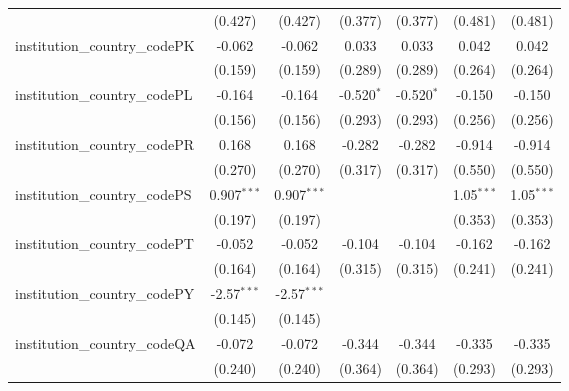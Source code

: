 \begin{tabular}{lcccccc}
                                         & (0.427)        & (0.427)        & (0.377)        & (0.377)        & (0.481)        & (0.481)\\   
   institution\_country\_codePK          & -0.062         & -0.062         & 0.033          & 0.033          & 0.042          & 0.042\\   
                                         & (0.159)        & (0.159)        & (0.289)        & (0.289)        & (0.264)        & (0.264)\\   
   institution\_country\_codePL          & -0.164         & -0.164         & -0.520$^{*}$   & -0.520$^{*}$   & -0.150         & -0.150\\   
                                         & (0.156)        & (0.156)        & (0.293)        & (0.293)        & (0.256)        & (0.256)\\   
   institution\_country\_codePR          & 0.168          & 0.168          & -0.282         & -0.282         & -0.914         & -0.914\\   
                                         & (0.270)        & (0.270)        & (0.317)        & (0.317)        & (0.550)        & (0.550)\\   
   institution\_country\_codePS          & 0.907$^{***}$  & 0.907$^{***}$  &                &                & 1.05$^{***}$   & 1.05$^{***}$\\   
                                         & (0.197)        & (0.197)        &                &                & (0.353)        & (0.353)\\   
   institution\_country\_codePT          & -0.052         & -0.052         & -0.104         & -0.104         & -0.162         & -0.162\\   
                                         & (0.164)        & (0.164)        & (0.315)        & (0.315)        & (0.241)        & (0.241)\\   
   institution\_country\_codePY          & -2.57$^{***}$  & -2.57$^{***}$  &                &                &                &   \\   
                                         & (0.145)        & (0.145)        &                &                &                &   \\   
   institution\_country\_codeQA          & -0.072         & -0.072         & -0.344         & -0.344         & -0.335         & -0.335\\   
                                         & (0.240)        & (0.240)        & (0.364)        & (0.364)        & (0.293)        & (0.293)\\   

\end{tabular}
